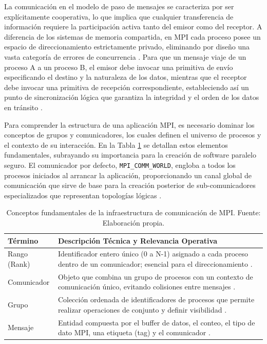 La comunicación en el modelo de paso de mensajes se caracteriza por ser explícitamente cooperativa, lo que implica que cualquier transferencia de información requiere la participación activa tanto del emisor como del receptor. A diferencia de los sistemas de memoria compartida, en MPI cada proceso posee un espacio de direccionamiento estrictamente privado, eliminando por diseño una vasta categoría de errores de concurrencia \cite{ref8_cristian_Nielsen2016}. Para que un mensaje viaje de un proceso A a un proceso B, el emisor debe invocar una primitiva de envío especificando el destino y la naturaleza de los datos, mientras que el receptor debe invocar una primitiva de recepción correspondiente, estableciendo así un punto de sincronización lógica que garantiza la integridad y el orden de los datos en tránsito \cite{ref9_cristian_Gropp1996, ref1_cristian_MPIStandard41}.

Para comprender la estructura de una aplicación MPI, es necesario dominar los conceptos de grupos y comunicadores, los cuales definen el universo de procesos y el contexto de su interacción. En la Tabla \ref{tab:mpi_concepts} se detallan estos elementos fundamentales, subrayando su importancia para la creación de software paralelo seguro. El comunicador por defecto, \texttt{MPI\_COMM\_WORLD}, engloba a todos los procesos iniciados al arrancar la aplicación, proporcionando un canal global de comunicación que sirve de base para la creación posterior de sub-comunicadores especializados que representan topologías lógicas \cite{ref9_cristian_Gropp1996, ref8_cristian_Nielsen2016}.

\begin{table}[H]
    \centering
    \caption{Conceptos fundamentales de la infraestructura de comunicación de MPI. Fuente: Elaboración propia.}
    \label{tab:mpi_concepts}
    \begin{tabular}{|l|p{10cm}|}
    \hline
    \textbf{Término} & \textbf{Descripción Técnica y Relevancia Operativa} \\ \hline
    Rango (Rank) & Identificador entero único (0 a N-1) asignado a cada proceso dentro de un comunicador; esencial para el direccionamiento \cite{ref9_cristian_Gropp1996}. \\ \hline
    Comunicador & Objeto que combina un grupo de procesos con un contexto de comunicación único, evitando colisiones entre mensajes \cite{ref8_cristian_Nielsen2016}. \\ \hline
    Grupo & Colección ordenada de identificadores de procesos que permite realizar operaciones de conjunto y definir visibilidad \cite{ref9_cristian_Gropp1996}. \\ \hline
    Mensaje & Entidad compuesta por el buffer de datos, el conteo, el tipo de dato MPI, una etiqueta (tag) y el comunicador \cite{ref1_cristian_MPIStandard41}. \\ \hline
    \end{tabular}
\end{table}

